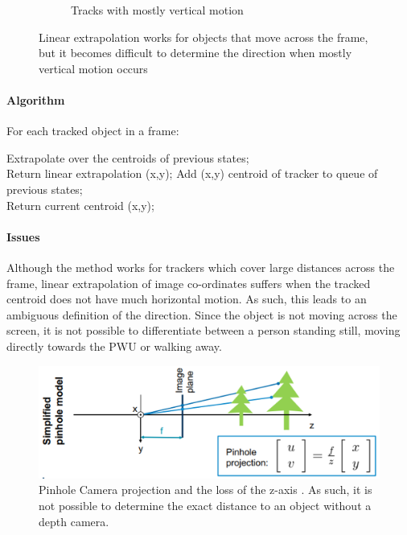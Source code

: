 \begin{figure}[ht]
\begin{subfigure}[b]{.45\textwidth}
		\caption{Tracks with mostly vertical motion}
	\end{subfigure}
	\vspace{-1\baselineskip}
	\begin{center}
		\caption{Linear extrapolation works for objects that move across the frame, but it becomes difficult to determine the direction when mostly vertical motion occurs}
		\label{fig:linExProblem}
	\end{center}
	\vspace{-2\baselineskip}
\end{figure}

\paragraph{Algorithm} For each tracked object in a frame:

\begin{algorithm}[ht] 
	
	{
		{
			{
				Extrapolate over the centroids of previous states; \\
				Return linear extrapolation (x,y);
			}
			{
				Add (x,y) centroid of tracker to queue of previous states;	\\
				Return current centroid (x,y);
			}
		}
	
	}
\end{algorithm}

\paragraph{Issues} Although the method works for trackers which cover large distances across the frame, linear extrapolation of image co-ordinates suffers when the tracked centroid does not have much horizontal motion. As such, this leads to an ambiguous definition of the direction. Since the object is not moving across the screen, it is not possible to differentiate between a person standing still, moving directly towards the PWU or walking away.

\begin{figure}[ht]
	\centering
	\includegraphics[width=0.8\linewidth]{img/chapter4_analysis/pinholecamera.png}
	\caption{Pinhole Camera projection and the loss of the z-axis \cite{Leutenegger2019}. As such, it is not possible to determine the exact distance to an object without a depth camera.}
	\label{fig:pinhole}
	\vspace{-1\baselineskip}
\end{figure}

